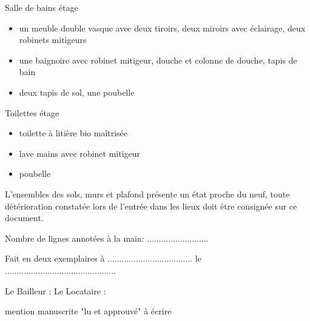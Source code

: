 \documentclass[a4paper,11pt]{article}
\begin{document}
Salle de bains étage
\begin{itemize}
\item un meuble double vasque avec deux tiroirs, deux miroirs avec éclairage, deux robinets mitigeurs
\item une baignoire avec robinet mitigeur, douche et colonne de douche, tapis de bain
\item deux tapis de sol, une poubelle
\end{itemize}

\vspace{0.5cm}

Toilettes étage
\begin{itemize}
\item toilette à litière bio maîtrisée
\item lave mains avec robinet mitigeur
\item poubelle
\end{itemize}

\vspace{0.25cm}

L'ensembles des sols, murs et plafond présente un état proche du neuf, toute détérioration constatée lors de l'entrée dans les lieux doit être consignée sur ce document.

\vspace{0.25cm}

Nombre de lignes annotées à la main: ..........................

\vspace{0.25cm}

Fait en deux exemplaires à .................................... le ...............................................

\vspace{0.25cm}

Le Bailleur : \hspace{3cm}Le Locataire : 

\hspace{5.2cm}mention manuscrite "lu et approuvé" à écrire


\newpage{}
\end{document}
